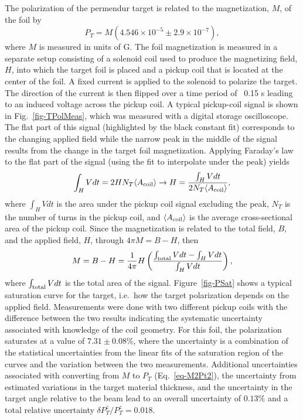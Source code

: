 The polarization of the permendur target is related to the magnetization, $M$, of the foil by \cite{Band:1997ee} 
%
\begin{equation}
\label{eq-M2Pt2}
	P_T=M\left(4.546\times 10^{-5}\pm 2.9\times 10^{-7}\right),
\end{equation}
%
where $M$ is measured in units of G. The foil magnetization is measured in a separate setup consisting of a solenoid coil used to produce 
the magnetizing field, $H$, into which the target foil is placed and a pickup coil that is located at the center of the foil. A fixed current is 
applied to the solenoid to polarize the target. The direction of the current is then flipped over a time period of ~0.15 s leading to an 
induced voltage across the pickup coil. A typical pickup-coil signal is shown in Fig.~\ref{fig-TPolMeas}, which was measured with a 
digital storage oscilloscope. The flat part of this signal (highlighted by the black constant fit) corresponds to the changing applied field while 
the narrow peak in the middle of the signal results from the change in the target foil magnetization. Applying Faraday's law to the flat part of 
the signal (using the fit to interpolate under the peak) yields
%
\begin{equation}
\label{eq-H}
	\int_H  Vdt=2HN_T \langle A_{\rm coil}\rangle\rightarrow H=\frac{\int_H Vdt}{2N_T\langle A_{\rm coil}\rangle} ,
\end{equation}
%
where $\int_H Vdt$ is the area under the pickup coil signal excluding the peak, $N_T$ is the number of turns in the pickup coil, and 
$\langle A_{\rm coil}\rangle$ is the average cross-sectional area of the pickup coil.
Since the magnetization is related to the total field, $B$, and the applied field, $H$, through $4\pi M=B-H$, then
%
\begin{equation}
\label{eq-M}
	M=B-H=\frac{1}{4\pi}H\left(\frac{\int_{\rm total} Vdt-\int_HVdt}{\int_HVdt}\right),
\end{equation}
%
where $\int_{\rm total} Vdt$ is the total area of the signal. Figure~\ref{fig-PSat} shows a typical saturation curve for the target, i.e.~how 
the target polarization depends on the applied field. Measurements were done with two different pickup coils with the difference between 
the two results indicating the systematic uncertainty associated with knowledge of the coil geometry. For this foil, the polarization saturates 
at a value of $7.31\pm 0.08$\%, where the uncertainty is a combination of the statistical uncertainties from the linear fits of the saturation
region of the curves and the variation between the two measurements. Additional uncertainties associated with converting from $M$ to $P_T$ 
(Eq.~\ref{eq-M2Pt2}), the uncertainty from estimated variations in the target material thickness, and the uncertainty in the target angle relative
to the beam lead to an overall uncertainty of $0.13\%$ and a total relative uncertainty $\delta P_T^z/P_T^z=0.018$.



